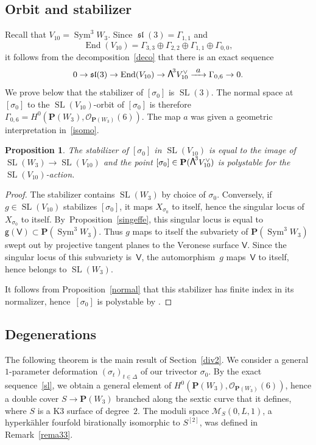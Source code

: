 \documentclass[JEP,XML,SOM,Unicode, NoEqCountersInSection,NoFloatCountersInSection]{cedram}
\let\mathcal\mathscr
\newcommand\To[1]{\mathchoice{\xrightarrow{\textstyle\kern4pt#1\kern3pt}}{\stackrel{#1}{\longrightarrow}}{}{}}
\newtheorem{prop}[lemm]{Proposition}
\theoremstyle{definition}
\renewcommand\P{{\mathbf P}}\let\PP\P
\newcommand\cM{\mathcal{M}}
\newcommand\cO{\mathcal{O}}\let\OO\cO
\newcommand\sfg{\mathsf{g}}
\newcommand\sfV{\mathsf{V}}
\newcommand\gv{\sfg(\sfV)}
\DeclareMathOperator{\gsl}{\mathfrak{sl}}
\DeclareMathOperator{\End}{End}
\DeclareMathOperator{\Sym}{Sym}
\DeclareMathOperator{\SL}{SL}
\newcommand\bw[1]{{\hbox{\large$\mathsf{\Lambda}$}^{\!#1}}}
\newcommand\hilbS{S^{[2]}}
\newcommand\hk{hyperkähler\xspace}
\begin{document}
\subsection{Orbit and stabilizer} \label{sect74}
Recall that $V_{10}= \Sym^3\! W_3$.
Since $\gsl(3)=\Gamma_{1,1} $ and
\[
\End(V_{10} )=\Gamma_{3,3} \oplus \Gamma_{2,2}\oplus \Gamma_{1,1}\oplus \Gamma_{0,0}
,
\]
it follows from the decomposition~\eqref{deco} that
there is an exact sequence
\begin{equation}\label{sl}
0\to \gsl(3)\to \End(V_{10})\to \bw3V_{10}^\vee \To{a} \Gamma_{0,6}\to 0.
\end{equation}
We prove below that the stabilizer of $[\sigma_0]$ is $\SL(3)$. The normal space at $[\sigma_0]$ to the $\SL(V_{10})$-orbit of $[\sigma_0]$ is therefore $ \Gamma_{0,6}=H^0(\P(W_3),\cO_{\P(W_3)}(6))$. The map $a$ was given a geometric interpretation in~\eqref{isomo}.

\begin{prop}\label{stabver}
The stabilizer of $[\sigma_0]$ in $\SL(V_{10})$ is equal to the image of $\SL(W_3)\to \SL(V_{10})$ and the point
$[\sigma_0]\in \P(\bw3V_{10}^\vee)$ is polystable for the $\SL(V_{10})$-action.
\end{prop}

\begin{proof}
The stabilizer contains $\SL(W_3)$ by choice of $\sigma_0$. Conversely, if $g\in\SL(V_{10})$ stabilizes $[\sigma_0]$, it maps $X_{\sigma_0}$ to itself, hence the singular locus of $X_{\sigma_0}$ to itself. By~Proposition~\ref{singeffe}, this singular locus is equal to $\gv\subset\PP(\Sym^3\! W_3)$. Thus $g$ maps to itself the subvariety of $\PP(\Sym^3\! W_3)$ swept out by projective tangent planes to the Veronese surface $\sfV$. Since the singular locus of this subvariety is~$\sfV$, the automorphism~$g$ maps~$\sfV$ to itself, hence belongs to $\SL(W_3)$.

It follows from Proposition~\ref{normal} that this stabilizer has finite index in its normalizer, hence~$[\sigma_0]$ is polystable by \cite[Cor.\,3]{luna}.
\end{proof}

\subsection{Degenerations}\label{dimodeg2}

The following theorem is the main result of Section~\ref{div2}. We consider a general $1$-parameter deformation $(\sigma_t)_{t\in \Delta}$ of our trivector $\sigma_0$. By the exact sequence~\eqref{sl}, we obtain a general element of $H^0(\P(W_3),\cO_{\P(W_3)}(6))$, hence a double cover $S\to \P(W_3)$ branched along the sextic curve that it defines, where $S$ is a K3 surface of degree~$2$. The moduli space $\cM_S(0,L,1)$, a \hk fourfold birationally isomorphic to $\hilbS$, was defined in Remark~\ref{rema33}.
\end{document}
